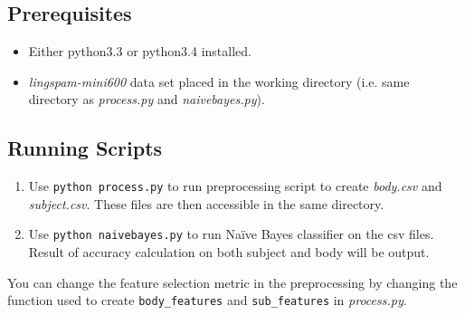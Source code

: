 \documentclass[10pt, a4paper]{article}
\begin{document}
\subsection{Prerequisites}

\begin{itemize}
\item Either python3.3 or python3.4 installed.
\item \textit{lingspam-mini600} data set placed in the working directory (i.e. same directory as \textit{process.py} and \textit{naivebayes.py}).
\end{itemize}

\subsection{Running Scripts}

\begin{enumerate}
\item Use \verb|python process.py| to run preprocessing script to create \textit{body.csv} and \textit{subject.csv}. These files are then accessible in the same directory.
\item Use \verb|python naivebayes.py| to run Na\"ive Bayes classifier on the csv files. Result of accuracy calculation on both subject and body will be output.
\end{enumerate}

You can change the feature selection metric in the preprocessing by changing the function used to create \verb|body_features| and \verb|sub_features| in \textit{process.py}.
\end{document}
